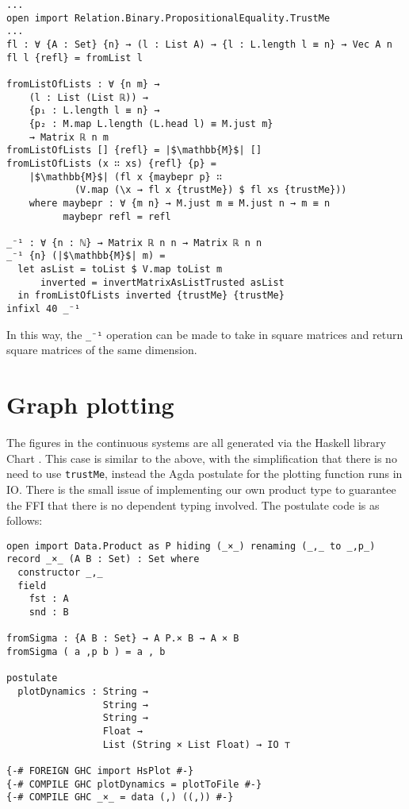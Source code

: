 \begin{verbatim}
...
open import Relation.Binary.PropositionalEquality.TrustMe
...
fl : ∀ {A : Set} {n} → (l : List A) → {l : L.length l ≡ n} → Vec A n
fl l {refl} = fromList l

fromListOfLists : ∀ {n m} → 
    (l : List (List ℝ)) → 
    {p₁ : L.length l ≡ n} → 
    {p₂ : M.map L.length (L.head l) ≡ M.just m}
    → Matrix ℝ n m
fromListOfLists [] {refl} = |$\mathbb{M}$| []
fromListOfLists (x ∷ xs) {refl} {p} = 
    |$\mathbb{M}$| (fl x {maybepr p} ∷ 
            (V.map (\x → fl x {trustMe}) $ fl xs {trustMe}))
    where maybepr : ∀ {m n} → M.just m ≡ M.just n → m ≡ n
          maybepr refl = refl

_⁻¹ : ∀ {n : ℕ} → Matrix ℝ n n → Matrix ℝ n n
_⁻¹ {n} (|$\mathbb{M}$| m) =
  let asList = toList $ V.map toList m
      inverted = invertMatrixAsListTrusted asList
  in fromListOfLists inverted {trustMe} {trustMe}
infixl 40 _⁻¹
\end{verbatim}

In this way, the \texttt{\_⁻¹} operation can be made to take in square matrices and return square matrices of the same dimension.

\section{Graph plotting}

The figures in the continuous systems are all generated via the Haskell library Chart \cite{chart}. This case is similar to the above, with the simplification that there is no need to use \texttt{trustMe}, instead the Agda postulate for the plotting function runs in IO. There is the small issue of implementing our own product type to guarantee the FFI that there is no dependent typing involved. The postulate code is as follows:
\begin{verbatim}
open import Data.Product as P hiding (_×_) renaming (_,_ to _,p_)
record _×_ (A B : Set) : Set where
  constructor _,_
  field
    fst : A
    snd : B

fromSigma : {A B : Set} → A P.× B → A × B
fromSigma ( a ,p b ) = a , b

postulate
  plotDynamics : String → 
                 String → 
                 String → 
                 Float → 
                 List (String × List Float) → IO ⊤

{-# FOREIGN GHC import HsPlot #-}
{-# COMPILE GHC plotDynamics = plotToFile #-}
{-# COMPILE GHC _×_ = data (,) ((,)) #-}
\end{verbatim}

